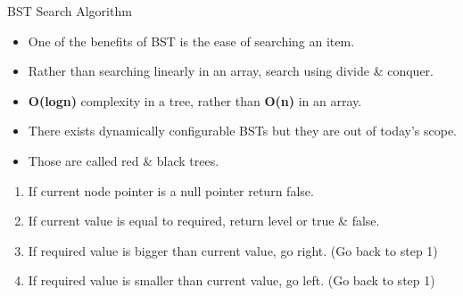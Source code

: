 \documentclass[aspectratio=169]{beamer}%
\begin{document}
\begin{frame}{BST Search Algorithm}
    \begin{itemize}
        \item One of the benefits of BST is the ease of searching an item.
        \item Rather than searching linearly in an array, search using divide \& conquer.
        \item \textbf{O(logn)} complexity in a tree, rather than \textbf{O(n)} in an array.
        \item There exists dynamically configurable BSTs but they are out of today's scope.
        \item Those are called red \& black trees.
    \end{itemize}
    \begin{enumerate}
        \item If current node pointer is a null pointer return false.
        \item If current value is equal to required, return level or true \& false.
        \item If required value is bigger than current value, go right. (Go back to step 1)
        \item If required value is smaller than current value, go left. (Go back to step 1)
    \end{enumerate}
\end{frame}
\end{document}

